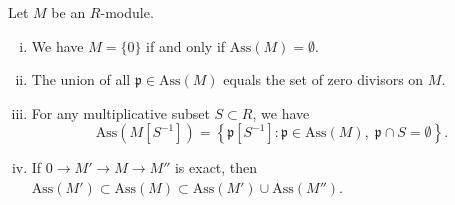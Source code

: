 \begin{theorem}\label{prop:Ass-properties}
	Let $M$ be an $R$-module.
	\begin{enumerate}[(i)]
		\item We have $M = \{0\}$ if and only if $\mathrm{Ass}(M) = \emptyset$.
		\item The union of all $\mathfrak{p} \in \mathrm{Ass}(M)$ equals the set of zero divisors on $M$.
		\item For any multiplicative subset $S \subset R$, we have
			\[ \mathrm{Ass}(M[S^{-1}]) = \left\{ \mathfrak{p}[S^{-1}] : \mathfrak{p} \in \mathrm{Ass}(M), \; \mathfrak{p} \cap S = \emptyset \right\} . \]
		\item If $0 \to M' \to M \to M''$ is exact, then $\mathrm{Ass}(M') \subset \mathrm{Ass}(M) \subset \mathrm{Ass}(M') \cup \mathrm{Ass}(M'')$.
	\end{enumerate}
\end{theorem}
